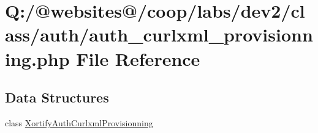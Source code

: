 \hypertarget{auth__curlxml__provisionning_8php}{\section{Q\-:/@websites@/coop/labs/dev2/class/auth/auth\-\_\-curlxml\-\_\-provisionning.php File Reference}
\label{auth__curlxml__provisionning_8php}
}
\subsection*{Data Structures}
\begin{DoxyCompactItemize}
\item 
class \hyperlink{class_xortify_auth_curlxml_provisionning}{Xortify\-Auth\-Curlxml\-Provisionning}
\end{DoxyCompactItemize}
